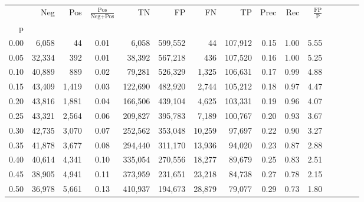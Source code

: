 \begin{tabular}{rrrcrrrrrrrrrrr}
\toprule
{} &     Neg &    Pos & $\frac{\text{Pos}}{\text{Neg}+\text{Pos}}$ &       TN &       FP &       FN &       TP &  Prec &   Rec & $\frac{\text{FP}}{\text{P}}$ \\
p    &         &        &                                            &          &          &          &          &       &       &                              \\
\midrule
0.00 &   6,058 &     44 &                                       0.01 &    6,058 &  599,552 &       44 &  107,912 &  0.15 &  1.00 &                         5.55 \\
0.05 &  32,334 &    392 &                                       0.01 &   38,392 &  567,218 &      436 &  107,520 &  0.16 &  1.00 &                         5.25 \\
0.10 &  40,889 &    889 &                                       0.02 &   79,281 &  526,329 &    1,325 &  106,631 &  0.17 &  0.99 &                         4.88 \\
0.15 &  43,409 &  1,419 &                                       0.03 &  122,690 &  482,920 &    2,744 &  105,212 &  0.18 &  0.97 &                         4.47 \\
0.20 &  43,816 &  1,881 &                                       0.04 &  166,506 &  439,104 &    4,625 &  103,331 &  0.19 &  0.96 &                         4.07 \\
0.25 &  43,321 &  2,564 &                                       0.06 &  209,827 &  395,783 &    7,189 &  100,767 &  0.20 &  0.93 &                         3.67 \\
0.30 &  42,735 &  3,070 &                                       0.07 &  252,562 &  353,048 &   10,259 &   97,697 &  0.22 &  0.90 &                         3.27 \\
0.35 &  41,878 &  3,677 &                                       0.08 &  294,440 &  311,170 &   13,936 &   94,020 &  0.23 &  0.87 &                         2.88 \\
0.40 &  40,614 &  4,341 &                                       0.10 &  335,054 &  270,556 &   18,277 &   89,679 &  0.25 &  0.83 &                         2.51 \\
0.45 &  38,905 &  4,941 &                                       0.11 &  373,959 &  231,651 &   23,218 &   84,738 &  0.27 &  0.78 &                         2.15 \\
0.50 &  36,978 &  5,661 &                                       0.13 &  410,937 &  194,673 &   28,879 &   79,077 &  0.29 &  0.73 &                         1.80 \\

\end{tabular}
